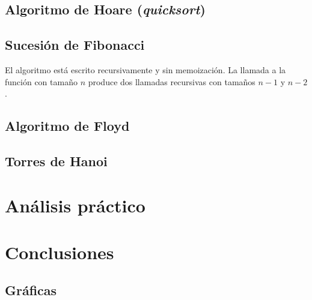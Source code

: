 \documentclass[a4paper, 11pt]{article} %
\begin{document}
\subsection{Algoritmo de Hoare (\textit{quicksort})}


\subsection {Sucesión de Fibonacci}
El algoritmo está escrito recursivamente y sin memoización. La llamada a la función con tamaño $n$ produce 
dos llamadas recursivas con tamaños $n-1$ y $n-2$.

\subsection{Algoritmo de Floyd}
\subsection{Torres de Hanoi}

\section {Análisis práctico}

\section {Conclusiones}
\subsection {Gráficas}
\end{document}
